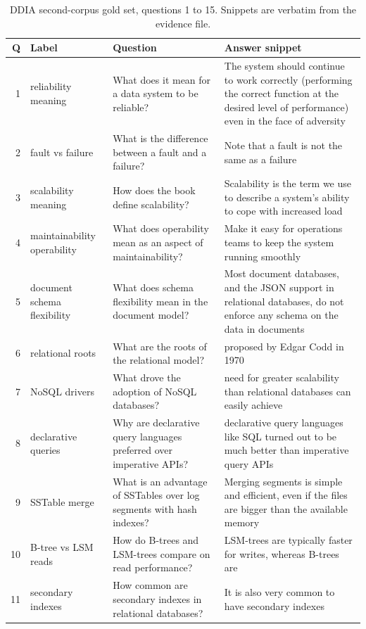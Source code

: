 \begin{table}[htbp]
\centering
\footnotesize
\caption{DDIA second-corpus gold set, questions 1 to 15. Snippets are verbatim from the evidence file.}
\label{tab:app-ddia}
\begin{tabular}{r p{2.4cm} p{4.4cm} p{6.0cm}}
\toprule
\textbf{Q} & \textbf{Label} & \textbf{Question} & \textbf{Answer snippet} \\
\midrule
1 & reliability meaning & What does it mean for a data system to be reliable? & The system should continue to work correctly (performing the correct function at the desired level of performance) even in the face of adversity \\
2 & fault vs failure & What is the difference between a fault and a failure? & Note that a fault is not the same as a failure \\
3 & scalability meaning & How does the book define scalability? & Scalability is the term we use to describe a system's ability to cope with increased load \\
4 & maintainability operability & What does operability mean as an aspect of maintainability? & Make it easy for operations teams to keep the system running smoothly \\
5 & document schema flexibility & What does schema flexibility mean in the document model? & Most document databases, and the JSON support in relational databases, do not enforce any schema on the data in documents \\
6 & relational roots & What are the roots of the relational model? & proposed by Edgar Codd in 1970 \\
7 & NoSQL drivers & What drove the adoption of NoSQL databases? & need for greater scalability than relational databases can easily achieve \\
8 & declarative queries & Why are declarative query languages preferred over imperative APIs? & declarative query languages like SQL turned out to be much better than imperative query APIs \\
9 & SSTable merge & What is an advantage of SSTables over log segments with hash indexes? & Merging segments is simple and efficient, even if the files are bigger than the available memory \\
10 & B-tree vs LSM reads & How do B-trees and LSM-trees compare on read performance? & LSM-trees are typically faster for writes, whereas B-trees are \\
11 & secondary indexes & How common are secondary indexes in relational databases? & It is also very common to have secondary indexes \\

\end{tabular}
\end{table}
